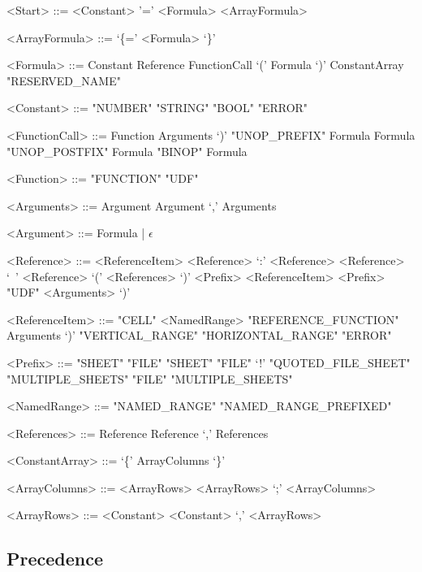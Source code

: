 \documentclass[conference]{IEEEtran}
\begin{document}
\begin{grammar}
<Start> ::= <Constant>
	\alt '=' <Formula>
	\alt <ArrayFormula>
	
<ArrayFormula> ::= `\{=' <Formula> `\}'

<Formula> ::= Constant
         \alt Reference
         \alt FunctionCall
         \alt `(' Formula `)'
         \alt ConstantArray
         \alt "RESERVED_NAME"
         
<Constant> ::= "NUMBER"
         \alt "STRING"
         \alt "BOOL"
         \alt "ERROR"
         
<FunctionCall> ::= Function Arguments `)'
		\alt "UNOP_PREFIX" Formula
		\alt Formula "UNOP_POSTFIX"
		\alt Formula "BINOP" Formula

<Function> ::= "FUNCTION"
	\alt "UDF"
	
<Arguments> ::= Argument
\alt Argument `,' Arguments

<Argument> ::= Formula | $\epsilon$

%
%
%
%




<Reference> ::= <ReferenceItem>
	\alt <Reference> `:' <Reference>
	\alt <Reference> `\ ' <Reference>
	\alt `(' <References> `)'
	\alt <Prefix> <ReferenceItem>
    \alt <Prefix> "UDF" <Arguments> `)'
    
<ReferenceItem> ::= "CELL"
	\alt <NamedRange>
	\alt "REFERENCE_FUNCTION" Arguments `)'
	\alt "VERTICAL_RANGE"
	\alt "HORIZONTAL_RANGE"
	\alt "ERROR"
	
<Prefix> ::= "SHEET"
	\alt "FILE" "SHEET"
	\alt "FILE" `!'
	\alt "QUOTED_FILE_SHEET"
	\alt "MULTIPLE_SHEETS"
	\alt "FILE" "MULTIPLE_SHEETS"
	
<NamedRange> ::= "NAMED_RANGE"
            \alt "NAMED_RANGE_PREFIXED"

<References> ::= Reference
	\alt Reference `,' References

<ConstantArray> ::= `\{' ArrayColumns `\}'

<ArrayColumns> ::= <ArrayRows>
	\alt <ArrayRows> `;' <ArrayColumns>

<ArrayRows> ::= <Constant>
	\alt <Constant> `,' <ArrayRows>

\end{grammar}

\subsection{Precedence}
\end{document}
